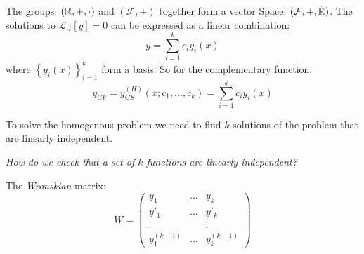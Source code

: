 \documentclass[10pt]{scrartcl}
\begin{document}
The groups: $(\mathbb{R}, +, \cdot)$ and $(\mathcal{F}, +)$ together form a vector Space: $(\mathcal{F},+,\dot{\mathbb{R}})$. The solutions to $\mathcal{L}_{\vec{\alpha}}[y] = 0$ can be expressed as a linear combination:
\[y = \sum_{i=1}^kc_iy_i(x)\]
where $\left\{y_i(x)\right\}_{i=1}^k$ form a basis. So for the complementary function:
\[y_{CF} = y_{GS}^{(H)}(x;c_1,\dots,c_k) = \sum_{i=1}^kc_iy_i(x)\]

To solve the homogenous problem we need to find $k$ solutions of the problem that are linearly independent. 

\emph{How do we check that a set of $k$ functions are linearly independent?}\\

\begin{definition}
The \emph{Wronskian} matrix:
\[W = 
\begin{pmatrix}
y_1 & \dots & y_k\\
y'_1 & \dots & y'_k\\
\vdots & & \vdots\\
y^{(k-1)}_1 & \dots & y^{(k-1)}_k	
\end{pmatrix}
\]	
\end{definition}
\end{document}
